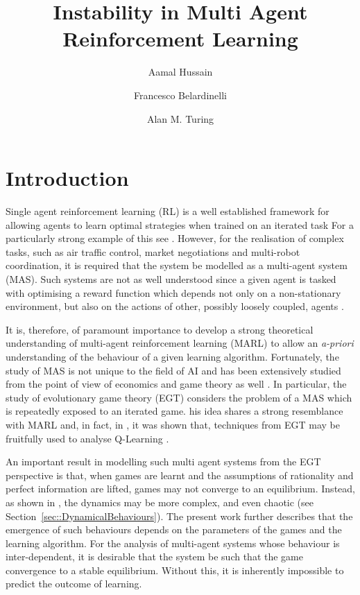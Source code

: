 \documentclass[sigconf]{aamas}
\title[InstabilityinMARL]{Instability in Multi Agent Reinforcement Learning}
\author{Aamal Hussain}
\affiliation{
  \institution{Secret Intelligence Service}
  \city{Vauxhall, London}}
\author{Francesco Belardinelli}
\affiliation{
  \institution{Analytical Engines, Inc.}
  \city{Ockham Park}
  \state{Surrey}}
\author{Alan M. Turing}
\affiliation{
  \department{Computing Machine Laboratory}
  \institution{Victoria University of Manchester}}
\begin{document}

\pagestyle{fancy}
\fancyhead{}


\maketitle 


\section{Introduction}

Single agent reinforcement learning (RL) is a well established framework for allowing agents to learn optimal strategies when trained on an iterated task 
For a particularly strong example of this see \cite{Vinyals2019}. However, for the realisation of complex tasks, such as air traffic control, market negotiations and multi-robot coordination, it is required that the system be modelled as a multi-agent system (MAS). Such systems are not as well understood since a given agent is tasked with optimising a reward function which depends not only on a non-stationary environment, but also on the actions of other, possibly loosely coupled, agents \cite{SchwartzMulti-agentApproach}. 

It is, therefore, of paramount importance to develop a strong theoretical understanding of multi-agent reinforcement learning (MARL) to allow an {\em a-priori} understanding of the behaviour of a given learning algorithm. Fortunately, the study of MAS is not unique to the field of AI and has been extensively studied from the point of view of economics and game theory as well \cite{ShohamMultiagentFoundations}. In particular, the study of evolutionary game theory (EGT) considers the problem of a MAS which is repeatedly exposed to an iterated game. 
his idea shares a strong resemblance with MARL and, in fact, in \cite{Tuyls2006AnGames}, it was shown that, techniques from EGT may be fruitfully used to analyse Q-Learning \cite{Sutton2018}.

An important result in modelling such multi agent systems from the EGT perspective is that, when games are learnt and the assumptions of rationality and perfect information are lifted, games may not converge to an equilibrium. Instead, as shown in \cite{Sanders2018}, the dynamics may be more complex, and even chaotic (see Section~\ref{sec::DynamicalBehaviours}). The present work further describes that the emergence of such behaviours depends on the parameters of the games and the learning algorithm. For the analysis of multi-agent systems whose behaviour is inter-dependent, it is desirable that the system be such that the game convergence to a stable equilibrium. Without this, it is inherently impossible to predict the outcome of learning.  
\end{document}
